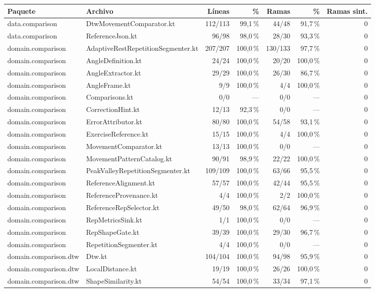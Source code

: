 \begin{tabular}{@{}llrrrrr@{}}
\toprule
\textbf{Paquete} & \textbf{Archivo} & \textbf{Líneas} & \textbf{\%} & \textbf{Ramas} & \textbf{\%} & \textbf{Ramas sint.} \\
\midrule
data.comparison & DtwMovementComparator.kt & 112/113 & 99,1\,\% & 44/48 & 91,7\,\% & 0 \\
data.comparison & ReferenceJson.kt & 96/98 & 98,0\,\% & 28/30 & 93,3\,\% & 0 \\
domain.comparison & AdaptiveRestRepetitionSegmenter.kt & 207/207 & 100,0\,\% & 130/133 & 97,7\,\% & 0 \\
domain.comparison & AngleDefinition.kt & 24/24 & 100,0\,\% & 20/20 & 100,0\,\% & 0 \\
domain.comparison & AngleExtractor.kt & 29/29 & 100,0\,\% & 26/30 & 86,7\,\% & 0 \\
domain.comparison & AngleFrame.kt & 9/9 & 100,0\,\% & 4/4 & 100,0\,\% & 0 \\
domain.comparison & Comparisons.kt & 0/0 & — & 0/0 & — & 0 \\
domain.comparison & CorrectionHint.kt & 12/13 & 92,3\,\% & 0/0 & — & 0 \\
domain.comparison & ErrorAttributor.kt & 80/80 & 100,0\,\% & 54/58 & 93,1\,\% & 0 \\
domain.comparison & ExerciseReference.kt & 15/15 & 100,0\,\% & 4/4 & 100,0\,\% & 0 \\
domain.comparison & MovementComparator.kt & 13/13 & 100,0\,\% & 0/0 & — & 0 \\
domain.comparison & MovementPatternCatalog.kt & 90/91 & 98,9\,\% & 22/22 & 100,0\,\% & 0 \\
domain.comparison & PeakValleyRepetitionSegmenter.kt & 109/109 & 100,0\,\% & 63/66 & 95,5\,\% & 0 \\
domain.comparison & ReferenceAlignment.kt & 57/57 & 100,0\,\% & 42/44 & 95,5\,\% & 0 \\
domain.comparison & ReferenceProvenance.kt & 4/4 & 100,0\,\% & 2/2 & 100,0\,\% & 0 \\
domain.comparison & ReferenceRepSelector.kt & 49/50 & 98,0\,\% & 62/64 & 96,9\,\% & 0 \\
domain.comparison & RepMetricsSink.kt & 1/1 & 100,0\,\% & 0/0 & — & 0 \\
domain.comparison & RepShapeGate.kt & 39/39 & 100,0\,\% & 29/30 & 96,7\,\% & 0 \\
domain.comparison & RepetitionSegmenter.kt & 4/4 & 100,0\,\% & 0/0 & — & 0 \\
domain.comparison.dtw & Dtw.kt & 104/104 & 100,0\,\% & 94/98 & 95,9\,\% & 0 \\
domain.comparison.dtw & LocalDistance.kt & 19/19 & 100,0\,\% & 26/26 & 100,0\,\% & 0 \\
domain.comparison.dtw & ShapeSimilarity.kt & 54/54 & 100,0\,\% & 33/34 & 97,1\,\% & 0 \\
\bottomrule
\end{tabular}
